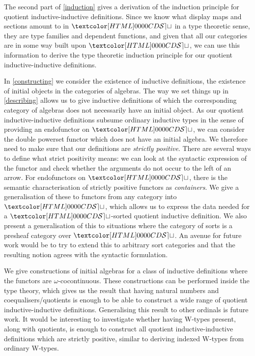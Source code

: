 The second part of \cref{induction} gives a derivation of the
induction principle for quotient inductive-inductive
definitions. Since we know what display maps and sections amount to in
$\SET$ in a type theoretic sense, \ie they are type families and
dependent functions, and given that all our categories are in some way
built upon $\SET$, we can use this information to derive the type
theoretic induction principle for our quotient inductive-inductive
definitions.

In \cref{constructing} we consider the existence of inductive
definitions, \ie the existence of initial objects in the categories of
algebras. The way we set things up in \cref{describing} allows us to
give inductive definitions of which the corresponding category of
algebras does not necessarily have an initial object. As our quotient
inductive-inductive definitions subsume ordinary inductive types in
the sense of providing an endofunctor on $\SET$, we can consider the
double powerset functor which does not have an initial algebra. We
therefore need to make sure that our definitions are \emph{strictly
  positive}. There are several ways to define what strict positivity
means: we can look at the syntactic expression of the functor and
check whether the arguments do not occur to the left of an arrow. For
endofunctors on $\SET$, there is the semantic characterisation of
strictly positive functors as \emph{containers}. We give a
generalisation of these to functors from any category into $\SET$,
which allows us to express the data needed for a $\SET$-sorted
quotient inductive definition. We also present a generalisation of
this to situations where the category of sorts is a presheaf category
over $\SET$. An avenue for future work would be to try to extend this
to arbitrary sort categories and that the resulting notion agrees with
the syntactic formulation.

We give constructions of initial algebras for a class of inductive
definitions where the functors are $\omega$-cocontinuous. These
constructions can be performed inside the type theory, which gives us
the result that having natural numbers and coequalisers/quotients is
enough to be able to construct a wide range of quotient
inductive-inductive definitions. Generalising this result to other
ordinals is future work. It would be interesting to investigate
whether having W-types present, along with quotients, is enough to
construct all quotient inductive-inductive definitions which are
strictly positive, similar to deriving indexed W-types from ordinary
W-types.

